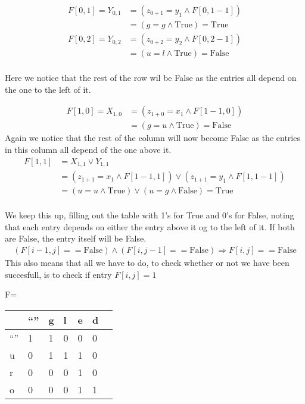 \documentclass{article}
\theoremstyle{remark}
\numberwithin{equation}{section}
\begin{document}
	 
	
	\begin{align*}
	F[0,1] = Y_{0,1}&=(z_{0+1}=y_1 \wedge F[0,1-1])\\
	&=(g=g \wedge \text{True})=\text{True}\\
	F[0,2]=Y_{0,2} &=(z_{0+2}=y_2 \wedge F[0,2-1])\\
	&=(u=l \wedge \text{True})=\text{False}\\
	\end{align*}
	
	Here we notice that the rest of the row wil be False as the entries all depend on the one to the left of it.  
	
	\begin{align*}
	F[1,0] = X_{1,0}&=(z_{1+0}=x_1 \wedge F[1-1,0])\\
	&=(g=u \wedge \text{True})=\text{False}
	\end{align*}
	Again we notice that the rest of the column will now become False as the entries in this column all depend of the one above it. 
	\begin{align*}
	F[1,1] &= X_{1,1}\vee Y_{1,1}\\
	&=(z_{1+1}=x_1 \wedge F[1-1,1])\vee (z_{1+1}=y_1 \wedge F[1,1-1])\\
	&=(u=u \wedge \text{True})\vee (u=g \wedge \text{False})=\text{True}\\
	\end{align*}	
	
	We keep this up, filling out the table with 1's for True and 0's for False, noting that each entry depends on either the entry above it og to the left of it. If both are False, the entry itself will be False. \\
	\begin{align}\label{Solution}
		(F[i-1,j]==\text{False})\wedge (F[i,j-1]==\text{False}) \Rightarrow F[i,j]==\text{False}
	\end{align}
	This also means that all we have to do, to check whether or not we have been succesfull, is to check if entry $F[i,j]=1$
	 

\begin{center} 
	F=
	\begin{tabular}{|l|l|l|l|l|l|l|}
		\hline
		& \textquotedblleft \textquotedblright & g & l & e & d   \\ \hline
		\textquotedblleft \textquotedblright & 1  & 1 & 0 & 0 & 0  \\ \hline
		u  & 0  & 1 & 1 & 1 & 0  \\ \hline
		r  & 0  & 0 & 0 & 1 & 0  \\ \hline
		o  & 0  & 0 & 0 & 1 & 1  \\ \hline
	\end{tabular}
\end{center}
\end{document}
